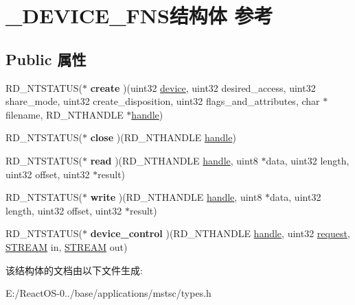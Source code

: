 \hypertarget{struct___d_e_v_i_c_e___f_n_s}{}\section{\+\_\+\+D\+E\+V\+I\+C\+E\+\_\+\+F\+N\+S结构体 参考}
\label{struct___d_e_v_i_c_e___f_n_s}
\subsection*{Public 属性}
\begin{DoxyCompactItemize}
\item 
\mbox{\label{struct___d_e_v_i_c_e___f_n_s_afb66d47f7656cd247acd620fde8aecad}} 
R\+D\+\_\+\+N\+T\+S\+T\+A\+T\+US($\ast$ {\bfseries create} )(uint32 \hyperlink{structdevice}{device}, uint32 desired\+\_\+access, uint32 share\+\_\+mode, uint32 create\+\_\+disposition, uint32 flags\+\_\+and\+\_\+attributes, char $\ast$filename, R\+D\+\_\+\+N\+T\+H\+A\+N\+D\+LE $\ast$\hyperlink{structhandle}{handle})
\item 
\mbox{\label{struct___d_e_v_i_c_e___f_n_s_a9a6b0a1000a560f5012aed1f204d66cd}} 
R\+D\+\_\+\+N\+T\+S\+T\+A\+T\+US($\ast$ {\bfseries close} )(R\+D\+\_\+\+N\+T\+H\+A\+N\+D\+LE \hyperlink{structhandle}{handle})
\item 
\mbox{\label{struct___d_e_v_i_c_e___f_n_s_a6aa46994f3c966420308af7ec43e32e5}} 
R\+D\+\_\+\+N\+T\+S\+T\+A\+T\+US($\ast$ {\bfseries read} )(R\+D\+\_\+\+N\+T\+H\+A\+N\+D\+LE \hyperlink{structhandle}{handle}, uint8 $\ast$data, uint32 length, uint32 offset, uint32 $\ast$result)
\item 
\mbox{\label{struct___d_e_v_i_c_e___f_n_s_afd64ec290e4ee7815acafe22ca760236}} 
R\+D\+\_\+\+N\+T\+S\+T\+A\+T\+US($\ast$ {\bfseries write} )(R\+D\+\_\+\+N\+T\+H\+A\+N\+D\+LE \hyperlink{structhandle}{handle}, uint8 $\ast$data, uint32 length, uint32 offset, uint32 $\ast$result)
\item 
\mbox{\label{struct___d_e_v_i_c_e___f_n_s_ac40b18978b9187728bd65e0636249eb2}} 
R\+D\+\_\+\+N\+T\+S\+T\+A\+T\+US($\ast$ {\bfseries device\+\_\+control} )(R\+D\+\_\+\+N\+T\+H\+A\+N\+D\+LE \hyperlink{structhandle}{handle}, uint32 \hyperlink{structrequest}{request}, \hyperlink{structstream}{S\+T\+R\+E\+AM} in, \hyperlink{structstream}{S\+T\+R\+E\+AM} out)
\end{DoxyCompactItemize}


该结构体的文档由以下文件生成\+:\begin{DoxyCompactItemize}
\item 
E\+:/\+React\+O\+S-\/0../base/applications/mstsc/types.\+h\end{DoxyCompactItemize}
